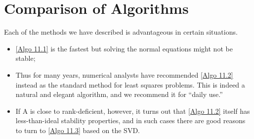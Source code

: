 \section{Comparison of Algorithms} 
Each of the methods we have described is advantageous in certain situations.
\begin{itemize}
    \item \autoref{Algo 11.1} is the fastest but solving the normal equations might not be stable; 
    \item Thus for many years, numerical analysts have recommended \autoref{Algo 11.2} instead as the standard method for least squares problems. This is indeed a natural and elegant algorithm, and we recommend it for ``daily use.''
    \item If A is close to rank-deficient, however, it turns out that \autoref{Algo 11.2} itself has less-than-ideal stability properties, and in such cases there are good reasons to turn to \autoref{Algo 11.3} based on the SVD.
\end{itemize}
